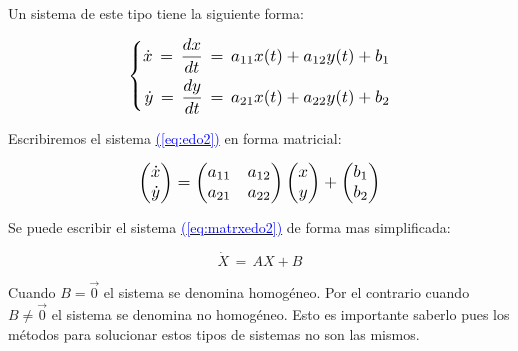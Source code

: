 \documentclass[12pt,a4paper]{report} %
\newcommand{\eref}[1]{\hyperref[#1]{\textcolor{blue}{(\ref*{#1})}}}
\newcommand{\eref}[1]{\hyperref[#1]{\textcolor{blue}{\textit{(\ref*{#1})}}}}
\begin{document}
	\vspace{0.5cm}\noindent Un sistema de este tipo tiene la siguiente forma:
	
	\begin{equation}
		\label{eq:edo2}
		\scalebox{1.2}{$\displaystyle
			\left\{
			\begin{aligned}
				\dot{x}\,=\,\frac{dx}{dt}\,=\,a_{11}x(t)+a_{12}y(t)+b_1 \\
				\dot{y}\,=\,\frac{dy}{dt}\,=\,a_{21}x(t)+a_{22}y(t)+b_2
			\end{aligned}
			\right.
			$}
	\end{equation}\smallskip
	
	\vspace{0.5cm}\noindent Escribiremos el sistema \eref{eq:edo2} en forma matricial:
	
	\begin{equation}
		\label{eq:matrxedo2}
		\scalebox{1.2}{$\displaystyle
		\begin{pmatrix}
			\dot{x}\\
			\dot{y}\\
		\end{pmatrix} =
		\begin{pmatrix}
			a_{11} & a_{12}\\
		    a_{21} & a_{22}\\
		\end{pmatrix} 
		\begin{pmatrix}
			x\\
			y\\
		\end{pmatrix} + 
		\begin{pmatrix}
			b_1\\
			b_2\\
		\end{pmatrix}
		$}
	\end{equation} \smallskip
	
	\vspace{0.5cm}\noindent Se puede escribir el sistema \eref{eq:matrxedo2} de forma mas simplificada:
	
	\begin{equation}
		\label{eq:sisautonomo}
		\dot{X}\,=\,AX+B
	\end{equation}\smallskip
	
	Cuando $B=\vec{0}$ el sistema se denomina homogéneo. Por el contrario cuando $B\neq\vec{0}$ el sistema se denomina no homogéneo. Esto es importante saberlo pues los métodos para solucionar estos tipos de sistemas no son las mismos.
	
\end{document}
